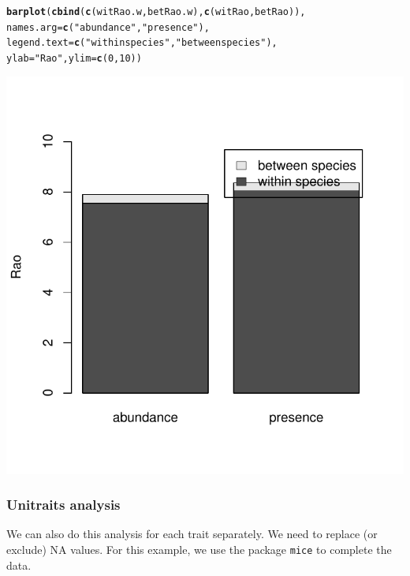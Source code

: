 \documentclass[12pt]{article}\usepackage[]{graphicx}\usepackage[]{color}
\makeatletter
\def\maxwidth{ %
  \ifdim\Gin@nat@width>\linewidth
    \linewidth
  \else
    \Gin@nat@width
  \fi
}
\newcommand{\hlnum}[1]{\textcolor[rgb]{0.686,0.059,0.569}{#1}}%
\newcommand{\hlstr}[1]{\textcolor[rgb]{0.192,0.494,0.8}{#1}}%
\newcommand{\hlstd}[1]{\textcolor[rgb]{0.345,0.345,0.345}{#1}}%
\newcommand{\hlkwc}[1]{\textcolor[rgb]{0.333,0.667,0.333}{#1}}%
\newcommand{\hlkwd}[1]{\textcolor[rgb]{0.737,0.353,0.396}{\textbf{#1}}}%
\newenvironment{kframe}{%
 \def\at@end@of@kframe{}%
 \ifinner\ifhmode%
  \def\at@end@of@kframe{\end{minipage}}%
  \begin{minipage}{\columnwidth}%
 \fi\fi%
 \def\FrameCommand##1{\hskip\@totalleftmargin \hskip-\fboxsep
 \colorbox{shadecolor}{##1}\hskip-\fboxsep
     \hskip-\linewidth \hskip-\@totalleftmargin \hskip\columnwidth}%
 \MakeFramed {\advance\hsize-\width
   \@totalleftmargin\z@ \linewidth\hsize
   \@setminipage}}%
 {\par\unskip\endMakeFramed%
 \at@end@of@kframe}
\newenvironment{knitrout}{}{} %
\makeatother
\begin{document}
\begin{knitrout}
\color{fgcolor}\begin{kframe}
\begin{alltt}
\hlkwd{barplot}\hlstd{(}\hlkwd{cbind}\hlstd{(}\hlkwd{c}\hlstd{(witRao.w, betRao.w),} \hlkwd{c}\hlstd{(witRao, betRao)),}
    \hlkwc{names.arg} \hlstd{=} \hlkwd{c}\hlstd{(}\hlstr{"abundance"} \hlstd{,}\hlstr{"presence"}\hlstd{),}
    \hlkwc{legend.text} \hlstd{=} \hlkwd{c}\hlstd{(}\hlstr{"within species"}\hlstd{,} \hlstr{"between species"}\hlstd{),}
    \hlkwc{ylab} \hlstd{=} \hlstr{"Rao"}\hlstd{,} \hlkwc{ylim} \hlstd{=} \hlkwd{c}\hlstd{(}\hlnum{0}\hlstd{,}\hlnum{10}\hlstd{))}
\end{alltt}
\end{kframe}

{\centering \includegraphics[width=\maxwidth]{figure/unnamed-chunk-18-1} 

}



\end{knitrout}


\subsubsection{Unitraits analysis}
We can also do this analysis for each trait separately. We need to replace (or exclude) NA values. For this example, we use the package \texttt{mice} to complete the data.
\end{document}
